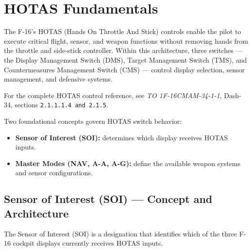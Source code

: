 \documentclass[11pt, a4paper, twoside]{report}
\newcommand{\dashrefs}[1]{\textit{TO 1F-16CMAM-34-1-1}, Dash-34, sections \texttt{#1}}
\begin{document}
\chapter{HOTAS Fundamentals}
\label{chap:C2}
The F-16’s HOTAS (Hands On Throttle And Stick) controls enable the pilot to execute critical flight, sensor, and weapon functions without removing hands from the throttle and side-stick controller. Within this architecture, three switches — the Display Management Switch (DMS), Target Management Switch (TMS), and Countermeasures Management Switch (CMS) — control display selection, sensor management, and defensive systems.

For the complete HOTAS control reference, see \dashrefs{2.1.1.1.4 and 2.1.5}.

Two foundational concepts govern HOTAS switch behavior:

\begin{itemize}
    \item \textbf{Sensor of Interest (SOI):} determines which display receives HOTAS inputs.
    \item \textbf{Master Modes (NAV, A-A, A-G):} define the available weapon systems and sensor configurations.
\end{itemize}

\section{Sensor of Interest (SOI) — Concept and Architecture}
\label{sec:C2-S1}

The Sensor of Interest (SOI) is a designation that identifies which of the three F-16 cockpit displays currently receives HOTAS inputs.

\end{document}
